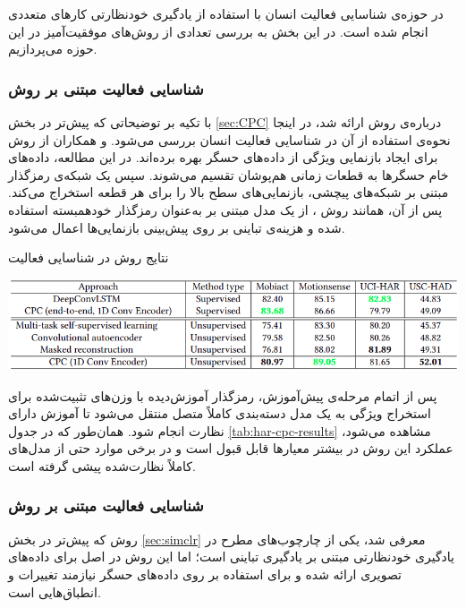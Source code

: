 در حوزه‌ی شناسایی فعالیت انسان با استفاده از یادگیری خودنظارتی کارهای متعددی انجام شده است. در این بخش به بررسی تعدادی از روش‌های موفقیت‌آمیز در این حوزه می‌پردازیم.

\subsubsection{شناسایی فعالیت مبتنی بر روش }

با تکیه بر توضیحاتی که پیش‌تر در بخش \ref{sec:CPC} درباره‌ی روش \cite{oord2018representation} ارائه شد، در اینجا نحوه‌ی استفاده از آن در شناسایی فعالیت انسان بررسی می‌شود.  و همکاران\cite{haresamudram2021contrastive} از روش  برای ایجاد بازنمایی ویژگی از داده‌های حسگر بهره برده‌اند. در این مطالعه، داده‌های خام حسگرها به قطعات زمانی هم‌پوشان تقسیم می‌شوند. سپس یک شبکه‌ی رمزگذار مبتنی بر شبکه‌های پیچشی، بازنمایی‌های سطح بالا را برای هر قطعه استخراج می‌کند. پس از آن، همانند روش ، از یک مدل مبتنی بر  به‌عنوان رمزگذار خودهمبسته استفاده شده و هزینه‌ی تباینی بر روی پیش‌بینی بازنمایی‌ها اعمال می‌شود.

\begin{table}[htbp]
\centering
\caption{نتایج روش  در شناسایی فعالیت}
\includegraphics[width=1\textwidth]{Images/Chapter2/har-cpc-results.png}
\label{tab:har-cpc-results}
\end{table}

پس از اتمام مرحله‌ی پیش‌آموزش، رمزگذار آموزش‌دیده با وزن‌های تثبیت‌شده برای استخراج ویژگی به یک مدل دسته‌بندی کاملاً متصل منتقل می‌شود تا آموزش دارای نظارت انجام شود. همان‌طور که در جدول \ref{tab:har-cpc-results} مشاهده می‌شود، عملکرد این روش در بیشتر معیارها قابل قبول است و در برخی موارد حتی از مدل‌های کاملاً نظارت‌شده پیشی گرفته است.

\subsubsection{شناسایی فعالیت مبتنی بر روش }

روش \cite{chen2020simple} که پیش‌تر در بخش \ref{sec:simclr} معرفی شد، یکی از چارچوب‌های مطرح در یادگیری خودنظارتی مبتنی بر یادگیری تباینی است؛ اما این روش در اصل برای داده‌های تصویری ارائه شده و برای استفاده بر روی داده‌های حسگر نیازمند تغییرات و انطباق‌هایی است.

